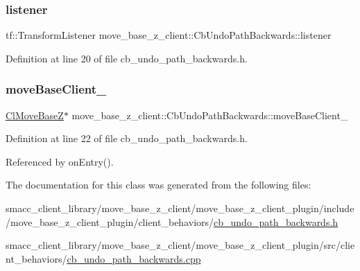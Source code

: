 \subsubsection{\texorpdfstring{listener}{listener}}
{\footnotesize\ttfamily tf\+::\+Transform\+Listener move\+\_\+base\+\_\+z\+\_\+client\+::\+Cb\+Undo\+Path\+Backwards\+::listener\hspace{0.3cm}{\ttfamily [private]}}



Definition at line 20 of file cb\+\_\+undo\+\_\+path\+\_\+backwards.\+h.

\mbox{\label{classmove__base__z__client_1_1CbUndoPathBackwards_a19e7ace85698725a1d2730a7c6b3aa7d}} 
\subsubsection{\texorpdfstring{move\+Base\+Client\+\_\+}{moveBaseClient\_}}
{\footnotesize\ttfamily \hyperlink{classmove__base__z__client_1_1ClMoveBaseZ}{Cl\+Move\+BaseZ}$\ast$ move\+\_\+base\+\_\+z\+\_\+client\+::\+Cb\+Undo\+Path\+Backwards\+::move\+Base\+Client\+\_\+\hspace{0.3cm}{\ttfamily [private]}}



Definition at line 22 of file cb\+\_\+undo\+\_\+path\+\_\+backwards.\+h.



Referenced by on\+Entry().



The documentation for this class was generated from the following files\+:\begin{DoxyCompactItemize}
\item 
smacc\+\_\+client\+\_\+library/move\+\_\+base\+\_\+z\+\_\+client/move\+\_\+base\+\_\+z\+\_\+client\+\_\+plugin/include/move\+\_\+base\+\_\+z\+\_\+client\+\_\+plugin/client\+\_\+behaviors/\hyperlink{cb__undo__path__backwards_8h}{cb\+\_\+undo\+\_\+path\+\_\+backwards.\+h}\item 
smacc\+\_\+client\+\_\+library/move\+\_\+base\+\_\+z\+\_\+client/move\+\_\+base\+\_\+z\+\_\+client\+\_\+plugin/src/client\+\_\+behaviors/\hyperlink{cb__undo__path__backwards_8cpp}{cb\+\_\+undo\+\_\+path\+\_\+backwards.\+cpp}\end{DoxyCompactItemize}
